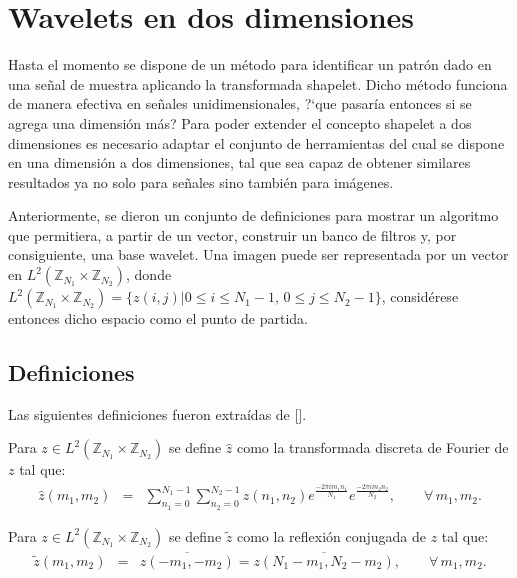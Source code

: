 \section{Wavelets en dos dimensiones}\label{cap:w2d}

\par Hasta el momento se dispone de un m\'etodo para identificar un patr\'on dado en una se\~nal de muestra aplicando la transformada shapelet. Dicho m\'etodo funciona de manera efectiva en se\~nales unidimensionales, ?`que pasar\'ia entonces si se agrega una dimensi\'on m\'as? Para poder extender el concepto shapelet a dos dimensiones es necesario adaptar el conjunto de herramientas del cual se dispone en una dimensi\'on a dos dimensiones, tal que sea capaz de obtener similares resultados ya no solo para se\~nales sino tambi\'en para im\'agenes.\\

\par Anteriormente, se dieron un conjunto de definiciones para mostrar un algoritmo que permitiera, a partir de un vector, construir un banco de filtros y, por consiguiente, una base wavelet. Una imagen puede ser representada por un vector en $L^2(\mathbb{Z}_{N_1}\times\mathbb{Z}_{N_2})$, donde $L^2(\mathbb{Z}_{N_1}\times\mathbb{Z}_{N_2})=\{z(i,j)|0\leq i \leq N_1-1,\,0\leq j\leq N_2-1\}$, consid\'erese entonces dicho espacio como el punto de partida.

\subsection{Definiciones}

\par Las siguientes definiciones fueron extra\'idas de [\textcolor{cyan}{\cite{12}}].\\

\begin{definition}
Para $z\in L^2(\mathbb{Z}_{N_1}\times\mathbb{Z}_{N_2})$ se define $\hat{z}$ como la transformada discreta de Fourier de $z$ tal que:
\begin{eqnarray}
\hat{z}(m_1,m_2)&=&\sum_{n_1=0}^{N_1-1}\sum_{n_2=0}^{N_2-1}z(n_1,n_2)e^{\frac{-2\pi im_1n_1}{N_1}}e^{\frac{-2\pi im_2n_2}{N_2}},\qquad\forall\,m_1,m_2.\nonumber
\end{eqnarray}
\end{definition}

\begin{definition}
Para $z\in L^2(\mathbb{Z}_{N_1}\times\mathbb{Z}_{N_2})$ se define $\tilde{z}$ como la reflexi\'on conjugada de $z$ tal que:
\begin{eqnarray}
\tilde{z}(m_1,m_2)&=&\overline{z(-m_1,-m_2)}=\overline{z(N_1-m_1,N_2-m_2)},\qquad\forall\,m_1,m_2.\nonumber
\end{eqnarray}
\end{definition}

